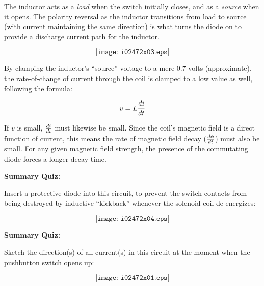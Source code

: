 
The inductor acts as a {\it load} when the switch initially closes, and as a {\it source} when it opens.  The polarity reversal as the inductor transitions from load to source (with current maintaining the same direction) is what turns the diode on to provide a discharge current path for the inductor.







$$\texttt{[image: i02472x03.eps]}$$

\vskip 10pt

By clamping the inductor's ``source'' voltage to a mere 0.7 volts (approximate), the rate-of-change of current through the coil is clamped to a low value as well, following the formula:

$$v = L{di \over dt}$$

If $v$ is small, $di \over dt$ must likewise be small.  Since the coil's magnetic field is a direct function of current, this means the rate of magnetic field decay (${d \phi \over dt}$) must also be small.  For any given magnetic field strength, the presence of the commutating diode forces a longer decay time.

\vfil \eject

\noindent
{\bf Summary Quiz:}

Insert a protective diode into this circuit, to prevent the switch contacts from being destroyed by inductive ``kickback'' whenever the solenoid coil de-energizes:

$$\texttt{[image: i02472x04.eps]}$$

\vfil \eject

\noindent
{\bf Summary Quiz:}

Sketch the direction(s) of all current(s) in this circuit at the moment when the pushbutton switch opens up:

$$\texttt{[image: i02472x01.eps]}$$





